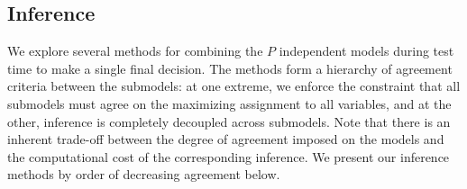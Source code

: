 
\subsection{Inference}
We explore several methods for combining the $P$ independent models
during test time to make a single final decision.  The methods form a
hierarchy of agreement criteria between the submodels: at one extreme,
we enforce the constraint that all submodels must agree on the
maximizing assignment to all variables, and at the other, inference is
completely decoupled across submodels. Note that there is an inherent
trade-off between the degree of agreement imposed on the models and the
computational cost of the corresponding inference.  We present our
inference methods by order of decreasing agreement below.

